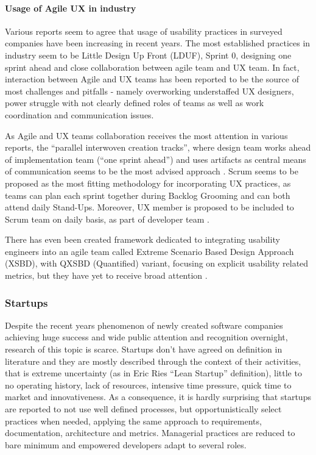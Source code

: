 \documentclass{article}
\begin{document}
\paragraph{Usage of Agile UX in industry}
Various reports seem to agree that usage of usability practices in surveyed companies have been increasing in recent years. The most established practices in industry seem to be Little Design Up Front (LDUF), Sprint 0, designing one sprint ahead and close collaboration between agile team and UX team. In fact, interaction between Agile and UX teams has been reported to be the source of most challenges and pitfalls - namely overworking understaffed UX designers, power struggle with not clearly defined roles of teams as well as work coordination and communication issues. \cite{salah2014systematic}\cite{jurca2014integrating}

As Agile and UX teams collaboration receives the most attention in various reports, the ``parallel interwoven creation tracks'', where design team works ahead of implementation team (``one sprint ahead'') and uses artifacts as central means of communication seems to be the most advised approach \cite{brhel2015exploring}. Scrum seems to be proposed as the most fitting methodology for incorporating UX practices, as teams can plan each sprint together during Backlog Grooming and can both attend daily Stand-Ups. Moreover, UX member is proposed to be included to Scrum team on daily basis, as part of developer team \cite{ovad2015prevalence}.

There has even been created framework dedicated to integrating usability engineers into an agile team called Extreme Scenario Based Design Approach (XSBD), with QXSBD (Quantified) variant, focusing on explicit usability related metrics, but they have yet to receive broad attention \cite{jurca2014integrating}.

\subsubsection{Startups}
Despite the recent years phenomenon of newly created software companies achieving huge success and wide public attention and recognition overnight, research of this topic is scarce. Startups don't have agreed on definition in literature and they are mostly described through the context of their activities, that is extreme uncertainty (as in Eric Ries ``Lean Startup'' \cite{ries2011lean} definition), little to no operating history, lack of resources, intensive time pressure, quick time to market and innovativeness. As a consequence, it is hardly surprising that startups are reported to not use well defined processes, but opportunistically select practices when needed, applying the same approach to requirements, documentation, architecture and metrics. Managerial practices are reduced to bare minimum and empowered developers adapt to several roles. \cite{paternoster2014software}
\end{document}
